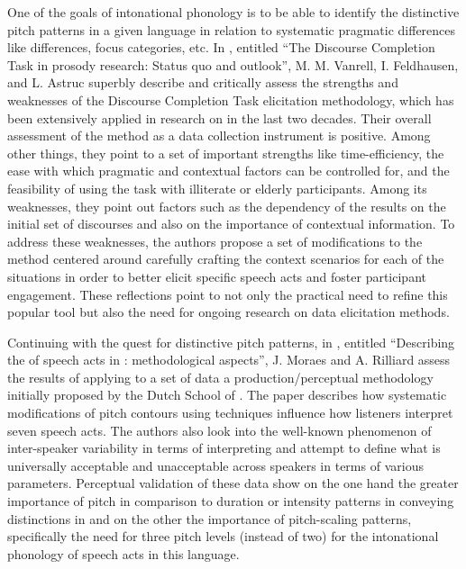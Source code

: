 \documentclass[output=paper]{langsci/langscibook}
\begin{document}
One of the goals of intonational phonology is to be able to identify the distinctive pitch patterns in a given language in relation to systematic pragmatic differences like  differences, focus categories, etc. In \textbf{}, entitled “The Discourse Completion Task in  prosody research: Status quo and outlook”, M. M. Vanrell, I. Feldhausen, and L. Astruc superbly describe and critically assess the strengths and weaknesses of the Discourse Completion Task elicitation methodology, which has been extensively applied in research on   in the last two decades. Their overall assessment of the method as a data collection instrument is positive. Among other things, they point to a set of important strengths like time-efficiency, the ease with which pragmatic and contextual factors can be controlled for, and the feasibility of using the task with illiterate or elderly participants. Among its weaknesses, they point out factors such as the dependency of the results on the initial set of discourses and also on the importance of contextual information. To address these weaknesses, the authors propose a set of modifications to the method centered around carefully crafting the context scenarios for each of the situations in order to better elicit specific speech acts and foster participant engagement. These reflections point to not only the practical need to refine this popular tool but also the need for ongoing research on data elicitation methods. 

Continuing with the quest for distinctive pitch patterns, in \textbf{}, entitled ``Describing the  of speech acts in : methodological aspects”, J. Moraes and A. Rilliard assess the results of applying to a set of  data a production/perceptual methodology initially proposed by the Dutch School of . The paper describes how systematic modifications of pitch contours using  techniques influence how  listeners interpret seven speech acts. The authors also look into the well-known phenomenon of inter-speaker variability in terms of interpreting  and attempt to define what is universally acceptable and unacceptable across speakers in terms of various  parameters. Perceptual validation of these data show on the one hand the greater importance of pitch in comparison to duration or intensity patterns in conveying  distinctions in  and on the other the importance of pitch-scaling patterns, specifically the need for three pitch levels (instead of two) for the intonational phonology of speech acts in this language. 
\end{document}
